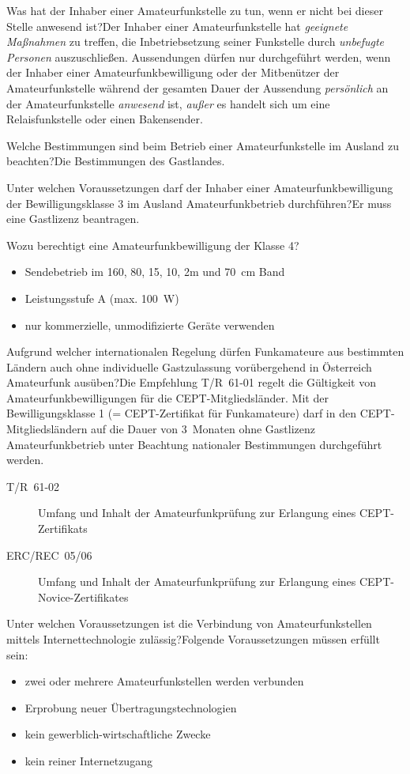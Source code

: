 \documentclass[avery5371,grid,frame,a4paper]{flashcards}
\newcommand{\card}[3]{
  \begin{flashcard}[{\chap} -- #1]{#2}#3\end{flashcard}
}
\begin{document}
\card{56}{Was hat der Inhaber einer Amateurfunkstelle zu tun, wenn er nicht bei dieser Stelle anwesend ist?}{Der Inhaber einer Amateurfunkstelle hat \emph{geeignete Maßnahmen} zu treffen, die Inbetriebsetzung seiner Funkstelle durch \emph{unbefugte Personen} auszuschließen. Aussendungen dürfen nur durchgeführt werden, wenn der Inhaber einer Amateurfunkbewilligung oder der Mitbenützer der Amateurfunkstelle während der gesamten Dauer der Aussendung \emph{persönlich} an der Amateurfunkstelle \emph{anwesend} ist, \emph{außer} es handelt sich um eine Relaisfunkstelle oder einen Bakensender.}

\card{57}{Welche Bestimmungen sind beim Betrieb einer Amateurfunkstelle im Ausland zu beachten?}{Die Bestimmungen des Gastlandes.}

\card{58}{Unter welchen Voraussetzungen darf der Inhaber einer Amateurfunkbewilligung der Bewilligungsklasse 3 im Ausland Amateurfunkbetrieb durchführen?}{Er muss eine Gastlizenz beantragen.}

\card{59}{Wozu berechtigt eine Amateurfunkbewilligung der Klasse 4?}{\begin{itemize}
  \item Sendebetrieb im 160, 80, 15, 10, 2m und \SI{70}{\centi\metre} Band
  \item Leistungsstufe A (max. \SI{100}{\watt})
  \item nur kommerzielle, unmodifizierte Geräte verwenden
\end{itemize}}

\card{60}{Aufgrund welcher internationalen Regelung dürfen Funkamateure aus bestimmten Ländern auch ohne individuelle Gastzulassung vorübergehend in Österreich Amateurfunk ausüben?}{\small Die Empfehlung T/R~61-01 regelt die Gültigkeit von Amateurfunkbewilligungen für die CEPT-Mitgliedsländer. Mit der Bewilligungsklasse 1 (= CEPT-Zertifikat für Funkamateure) darf in den CEPT-Mitgliedsländern auf die Dauer von 3~Monaten ohne Gastlizenz Amateurfunkbetrieb unter Beachtung nationaler Bestimmungen durchgeführt werden.

\begin{description}
  \item[T/R~61-02] Umfang und Inhalt der Amateurfunkprüfung zur Erlangung eines CEPT-Zertifikats
  \item[ERC/REC~05/06] Umfang und Inhalt der Amateurfunkprüfung zur Erlangung eines CEPT-Novice-Zertifikates
\end{description}
}

\card{61}{Unter welchen Voraussetzungen ist die Verbindung von Amateurfunkstellen mittels Internettechnologie zulässig?}{Folgende Voraussetzungen müssen erfüllt sein:
\begin{itemize}
  \item zwei oder mehrere Amateurfunkstellen werden verbunden
  \item Erprobung neuer Übertragungstechnologien
  \item kein gewerblich-wirtschaftliche Zwecke
  \item kein reiner Internetzugang
\end{itemize}}
\end{document}
